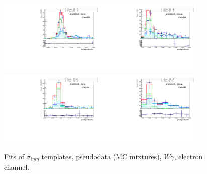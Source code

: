 \begin{figure}[htb]
\begin{center}
   \includegraphics[width=0.45\textwidth]{../figs/figs_v11/ELECTRON_WGamma/TemplateFits/c_TEMPL_SIHIH_UNblind__phoEt25to30__Barrel__RooFit_MCclosure.pdf}\includegraphics[width=0.45\textwidth]{../figs/figs_v11/ELECTRON_WGamma/TemplateFits/c_TEMPL_SIHIH_UNblind__phoEt25to30__Endcap__RooFit_MCclosure.pdf}\\
   \includegraphics[width=0.45\textwidth]{../figs/figs_v11/ELECTRON_WGamma/TemplateFits/c_TEMPL_SIHIH_UNblind__phoEt30to35__Barrel__RooFit_MCclosure.pdf}\includegraphics[width=0.45\textwidth]{../figs/figs_v11/ELECTRON_WGamma/TemplateFits/c_TEMPL_SIHIH_UNblind__phoEt30to35__Endcap__RooFit_MCclosure.pdf}\\
  \label{fig:templateFits_MCclosure_SIHIH_ELECTRON_1}
  \caption{Fits of $\sigma_{i \eta i \eta}$ templates, pseudodata (MC mixtures), $W\gamma$, electron channel.}
  \end{center}
\end{figure}

